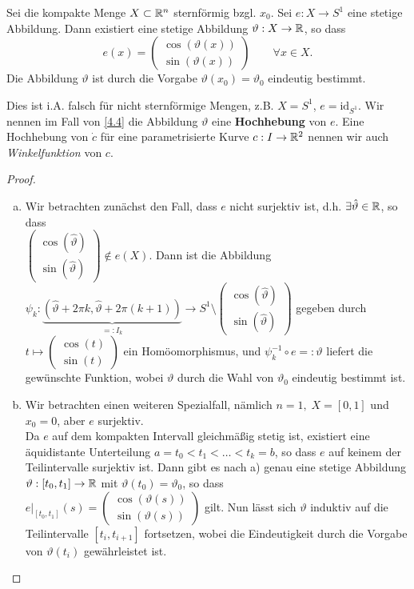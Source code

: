\documentclass[11pt]{scrbook}
\newcommand{\tta}{\vartheta}
\begin{document}
\begin{lem}[Hochhebungslemma]
\label{4.4}
Sei die kompakte Menge $X \subset \mathbb{R}^n$ sternförmig bzgl. $x_0$. Sei $e : X \to S^1$ eine stetige Abbildung. Dann existiert eine stetige Abbildung $\vartheta: X \to \mathbb{R}$, so dass 
\[ e(x) = \begin{pmatrix} \cos (\vartheta(x)) \\ \sin(\vartheta(x)) \end{pmatrix} \qquad \forall x \in X. \]
Die Abbildung $\vartheta$ ist durch die Vorgabe $\vartheta(x_0) = \vartheta_0$ eindeutig bestimmt.
\begin{note}
Dies ist i.A. falsch für nicht sternförmige Mengen, z.B. $X = S^1$, $e = \text{id}_{S^1}$. Wir nennen im Fall von \ref{4.4} die Abbildung $\tta$ eine \textbf{Hochhebung} von $e$. Eine Hochhebung von $\dot c$ für eine parametrisierte Kurve $c: I \to \mathbb{R}^2$ nennen wir auch \emph{Winkelfunktion} von $c$.
\end{note}
\begin{proof}
\begin{enumerate}[a)]
	\item 
Wir betrachten zunächst den Fall, dass $e$ nicht surjektiv ist, d.h. $\exists \hat \tta \in \R$, so dass \\  $\begin{pmatrix} \cos(\hat \tta) \\ \sin(\hat \tta) \end{pmatrix} \notin e(X) $. Dann ist die Abbildung $\psi_k: \underbrace{(\hat \tta + 2\pi k, \hat \tta + 2 \pi (k+1))}_{=: I_k} \to S^1 \setminus \begin{pmatrix} \cos(\hat \tta) \\ \sin(\hat \tta) \end{pmatrix} $ gegeben durch $t \mapsto \begin{pmatrix} \cos(t) \\ \sin(t) \end{pmatrix}$ ein Homöomorphismus, und $\psi_k^{-1} \circ e =: \tta$ liefert die gewünschte Funktion, wobei $\tta$ durch die Wahl von $\tta_0$ eindeutig bestimmt ist.

	\item 
Wir betrachten einen weiteren Spezialfall, nämlich $n = 1, \; X = [0,1]$ und $x_0 = 0$, aber $e$ surjektiv. \\
Da $e$ auf dem kompakten Intervall gleichmäßig stetig ist, existiert eine äquidistante Unterteilung $a = t_0 < t_1 < \dots < t_k = b$, so dass $e$ auf keinem der Teilintervalle surjektiv ist. Dann gibt es nach a) genau eine stetige Abbildung $\tta: [t_0, t_1] \to \R$ mit $\tta(t_0) = \tta_0$, so dass \\ $e\big |_{[t_0, t_1]}(s) = \begin{pmatrix} \cos(\tta(s)) \\ \sin(\tta(s)) \end{pmatrix}$ gilt. Nun lässt sich $\tta$ induktiv auf die Teilintervalle $[t_i, t_{i+1}]$ fortsetzen, wobei die Eindeutigkeit durch die Vorgabe von $\tta(t_i)$ gewährleistet ist.


\end{enumerate}
\end{proof}
\end{lem}
\end{document}
